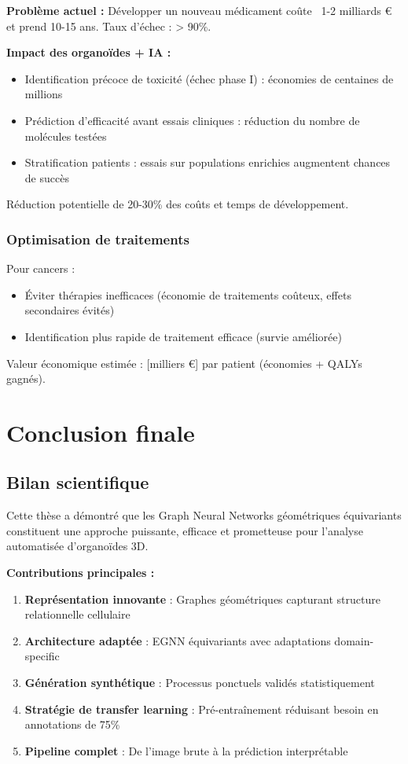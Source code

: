 \textbf{Problème actuel :}
Développer un nouveau médicament coûte ~1-2 milliards € et prend 10-15 ans. Taux d'échec : > 90\%.

\textbf{Impact des organoïdes + IA :}
\begin{itemize}
    \item Identification précoce de toxicité (échec phase I) : économies de centaines de millions
    \item Prédiction d'efficacité avant essais cliniques : réduction du nombre de molécules testées
    \item Stratification patients : essais sur populations enrichies augmentent chances de succès
\end{itemize}

Réduction potentielle de 20-30\% des coûts et temps de développement.

\subsubsection{Optimisation de traitements}

Pour cancers :
\begin{itemize}
    \item Éviter thérapies inefficaces (économie de traitements coûteux, effets secondaires évités)
    \item Identification plus rapide de traitement efficace (survie améliorée)
\end{itemize}

Valeur économique estimée : [milliers €] par patient (économies + QALYs gagnés).

\section{Conclusion finale}

\subsection{Bilan scientifique}

Cette thèse a démontré que les Graph Neural Networks géométriques équivariants constituent une approche puissante, efficace et prometteuse pour l'analyse automatisée d'organoïdes 3D.

\textbf{Contributions principales :}
\begin{enumerate}
    \item \textbf{Représentation innovante} : Graphes géométriques capturant structure relationnelle cellulaire
    \item \textbf{Architecture adaptée} : EGNN équivariants avec adaptations domain-specific
    \item \textbf{Génération synthétique} : Processus ponctuels validés statistiquement
    \item \textbf{Stratégie de transfer learning} : Pré-entraînement réduisant besoin en annotations de 75\%
    \item \textbf{Pipeline complet} : De l'image brute à la prédiction interprétable
\end{enumerate}

